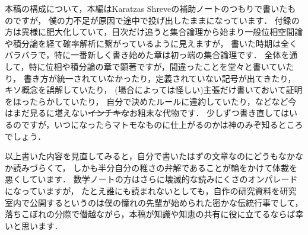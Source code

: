 本稿の構成について，本編はKaratzas Shreveの補助ノートのつもりで書いたものですが，
僕の力不足が原因で途中で投げ出したままになっています．
付録の方は異様に肥大化していて，目次だけ追うと集合論理から始まり一般位相空間論や積分論を経て確率解析に繋がっているように見えますが，
書いた時期は全くバラバラで，特に一番新しく書き始めた章は初っ端の集合論理です．
全体を通して，特に位相や積分論の章で顕著ですが，間違ったことを堂々と書いていたり，
書き方が統一されていなかったり，定義されていない記号が出てきたり，キソ概念を誤解していたり，
(場合によっては怪しい)主張だけ書いておいて証明をほったらかしていたり，
自分で決めたルールに違約していたり，などなど今はまだ見るに堪えない\sout{インチキな}お粗末な代物です．
少しずつ書き直してはいるのですが，いつになったらマトモなものに仕上がるのかは神のみぞ知るところでしょう．

以上書いた内容を見直してみると，自分で書いたはずの文章なのにどうもなかなか読みづらくて，
しかも半分自分の稚さの弁解であることが輪をかけて体裁を悪くしています．
数学ノートの方はさらに壊滅的な読みにくさのオンパレードになっていますが，
たとえ誰にも読まれないとしても，自作の研究資料を研究室内で公開するというのは僕の憧れの先輩が始められた密かな伝統行事でして，
落ちこぼれの分際で僭越ながら，本稿が知識や知恵の共有に役に立てるならば幸いと思います．

